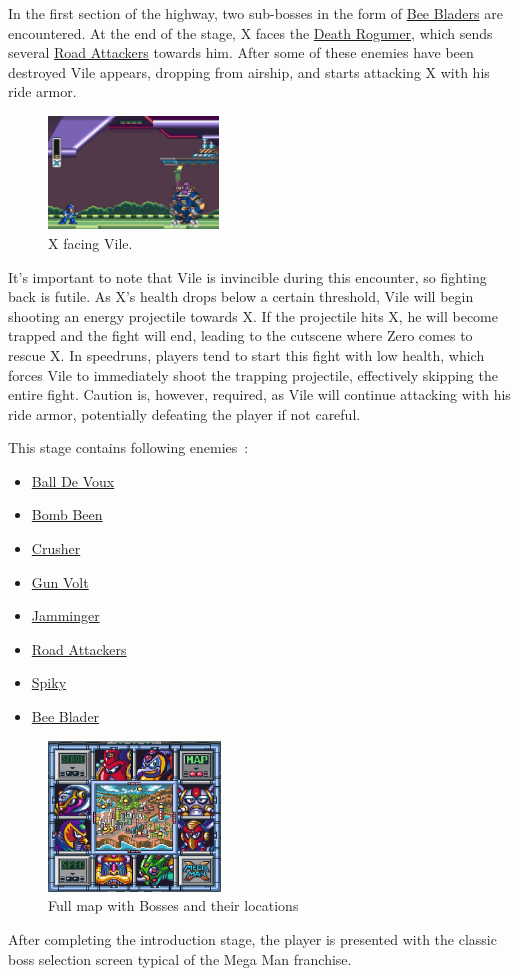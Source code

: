 In the first section of the highway, two sub-bosses in the form of \hyperlink{miniboss:Bee_Blader}{Bee Bladers} are encountered. At the end of the stage, X faces the \hyperlink{vehicle:Death_Rogumer}{Death Rogumer}, which sends several \hyperlink{enem:Road_Attackers}{Road Attackers} towards him. After some of these enemies have been destroyed Vile appears, dropping from  airship, and starts attacking X with his ride armor.\begin{figure}[htp]
	\centering
	\includegraphics[height=3cm]{figures/X1/Highway_screenshot.jpg}
	\caption{X facing Vile.}
\end{figure} It's important to note that Vile is invincible during this encounter, so fighting back is futile. As X's health drops below a certain threshold, Vile will begin shooting an energy projectile towards X. If the projectile hits X, he will become trapped and the fight will end, leading to the cutscene where Zero comes to rescue X. In speedruns, players tend  to start this fight with low health, which forces Vile to immediately shoot the trapping projectile, effectively skipping the entire fight. Caution is, however, required, as Vile will continue attacking with his ride armor, potentially defeating the player if not careful.

This stage contains following enemies~\cite{wiki:Highway}:
\begin{itemize}
	\item \hyperlink{enem:Ball_De_Voux}{Ball De Voux}
	\item \hyperlink{enem:Bomb_Been}{Bomb Been}
	\item \hyperlink{enem:Crusher}{Crusher}
	\item \hyperlink{enem:Gun_Volt}{Gun Volt}
	\item \hyperlink{enem:Jamminger}{Jamminger}
	\item \hyperlink{enem:Road_Attackers}{Road Attackers}
	\item \hyperlink{enem:Spiky}{Spiky }
	\item \hyperlink{miniboss:Bee_Blader}{Bee Blader }
\end{itemize}
\begin{figure}[htp]
	\centering
	\includegraphics[height=4cm]{figures/X1/Full_map.png}
	\caption{Full map with Bosses and their locations}
\end{figure}
After completing the introduction stage, the player is presented with the classic boss selection screen typical of the Mega Man franchise. 


